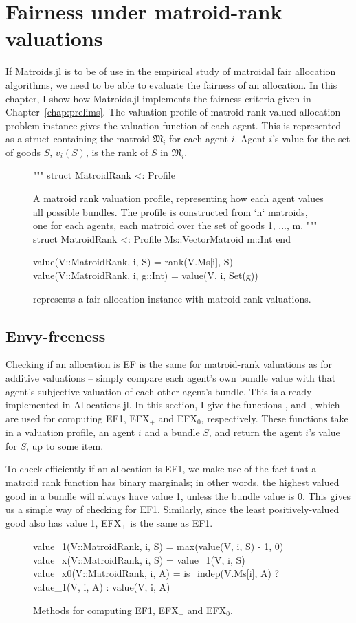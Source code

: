 \section{Fairness under matroid-rank valuations}
If Matroids.jl is to be of use in the empirical study of matroidal fair allocation algorithms, we need to be able to evaluate the fairness of an allocation. In this chapter, I show how Matroids.jl implements the fairness criteria given in Chapter~\ref{chap:prelims}. The valuation profile of matroid-rank-valued allocation problem instance gives the valuation function of each agent. This is represented as a struct containing the matroid $\mathfrak{M}_i$ for each agent $i$. Agent $i$'s value for the set of goods $S$, $v_i(S)$, is the rank of $S$ in $\mathfrak{M}_i$.
\begin{figure}[ht!]
\begin{jllisting}
"""
    struct MatroidRank <: Profile

A matroid rank valuation profile, representing how each agent values all possible bundles. The profile is constructed from `n` matroids, one for each agents, each matroid over the set of goods {1, ..., m}. 
"""
struct MatroidRank <: Profile
    Ms::Vector{Matroid}
    m::Int
end

value(V::MatroidRank, i, S) = rank(V.Ms[i], S)
value(V::MatroidRank, i, g::Int) = value(V, i, Set(g))
\end{jllisting}
\caption{ represents a fair allocation instance with matroid-rank valuations.}
\end{figure}

\subsection*{Envy-freeness}
Checking if an allocation is EF is the same for matroid-rank valuations as for additive valuations -- simply compare each agent's own bundle value with that agent's subjective valuation of each other agent's bundle. This is already implemented in Allocations.jl. In this section, I give the functions ,  and , which are used for computing EF1, EFX$_+$ and EFX$_0$, respectively. These functions take in a valuation profile, an agent $i$ and a bundle $S$, and return the agent $i$'s value for $S$, up to some item. 

To check efficiently if an allocation is EF1, we make use of the fact that a matroid rank function has binary marginals; in other words, the highest valued good in a bundle will always have value 1, unless the bundle value is 0. This gives us a simple way of checking for EF1. Similarly, since the least positively-valued good also has value 1, EFX$_+$ is the same as EF1.
\begin{figure}[ht!]
\begin{jllisting}
value_1(V::MatroidRank, i, S) = max(value(V, i, S) - 1, 0)
value_x(V::MatroidRank, i, S) = value_1(V, i, S)
value_x0(V::MatroidRank, i, A) =
    is_indep(V.Ms[i], A) ? value_1(V, i, A) : value(V, i, A)
\end{jllisting}
\caption{Methods for computing EF1, EFX$_+$ and EFX$_0$.}
\end{figure}

